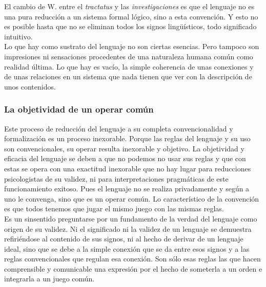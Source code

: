 \documentclass[a4paper, 11pt, twocolumn, spanish]{article}
\begin{document}
El cambio de W. entre el \emph{tractatus} y las \emph{investigaciones} es que el
lenguaje no es una pura reducción a un sistema formal lógico, sino a
esta convención. Y esto no es posible hasta que no se eliminan todos
los signos lingüísticos, todo significado intuitivo.\\
Lo que hay como sustrato del lenguaje no son ciertas esencias. Pero
tampoco son impresiones ni sensaciones procedentes de una naturaleza
humana común como realidad última. Lo que hay es vacío, la simple
coherencia de unas conexiones y de unas relaciones en un sistema que
nada tienen que ver con la descripción de unos contenidos.

\subsubsection{La objetividad de un operar común}
\label{sec:org0a5aa48}
Este proceso de reducción del lenguaje a su completa convencionalidad
y formalización es un proceso inexorable. Porque las reglas del
lenguaje y su uso son convencionales, su operar resulta inexorable y
objetivo. La objetividad y eficacia del lenguaje se deben a que no
podemos no usar sus reglas y que con estas se opera con una exactitud
inexorable que no hay lugar para reducciones psicologistas de su
validez, ni para interpretaciones pragmáticas de este funcionamiento
exitoso. Pues el lenguaje no se realiza privadamente y según a uno le
convenga, sino que es un operar común. Lo característico de la
convención es que todos tenemos que jugar el mismo juego con las
mismas reglas.\\

Es un sinsentido preguntarse por un fundamento de la verdad del
lenguaje como origen de su validez. Ni el significado ni la validez de
un lenguaje se demuestra refiriéndose al contenido de sus signos, ni
al hecho de derivar de un lenguaje ideal, sino que se debe a la simple
conexión que se da entre esos signos y a las reglas convencionales que
regulan esa conexión. Son sólo esas reglas las que hacen comprensible
y comunicable una expresión por el hecho de someterla a un orden e
integrarla a un juego común.
\end{document}
